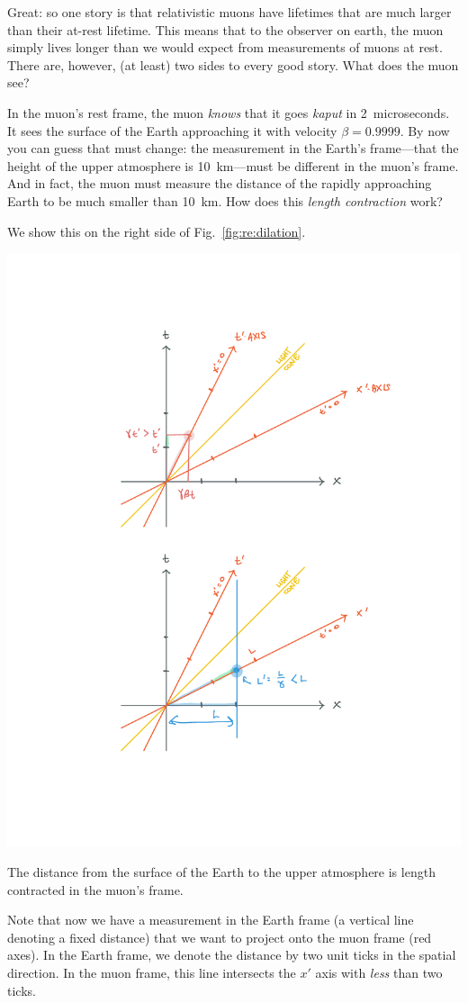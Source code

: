 \documentclass[12pt, oneside]{report}    %
\begin{document}
Great: so one story is that relativistic muons have lifetimes that are much larger than their at-rest lifetime. This means that to the observer on earth, the muon simply lives longer than we would expect from measurements of muons at rest. There are, however, (at least) two sides to every good story. What does the muon see?

In the muon's rest frame, the muon \emph{knows} that it goes \emph{kaput} in 2~microseconds. It sees the surface of the Earth approaching it with velocity $\beta = 0.9999$. By now you can guess that must change: the measurement in the Earth's frame---that the height of the upper atmosphere is 10~km---must be different in the muon's frame. And in fact, the muon must measure the distance of the rapidly approaching Earth to be much smaller than 10~km. How does this \emph{length contraction} work? 

We show this on the right side of Fig.~\ref{fig:re:dilation}.
\begin{marginfigure}
\includegraphics[width=\textwidth]{figures/rel_len_contractino.pdf}
\caption{The distance from the surface of the Earth to the upper atmosphere is length contracted in the muon's frame.
    \label{fig:re:dilation}
}
\end{marginfigure}
Note that now we have a measurement in the Earth frame (a vertical line denoting a fixed distance) that we want to project onto the muon frame (red axes). In the Earth frame, we denote the distance by two unit ticks in the spatial direction. In the muon frame, this line intersects the $x'$ axis with \emph{less} than two ticks.
\end{document}
